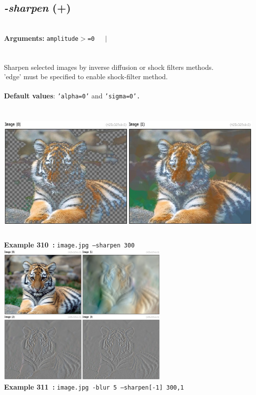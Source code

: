 \documentclass[a4paper,11pt,twoside]{book}
\begin{document}
\subsection{\emph{-sharpen} (+)}\vspace*{-0.5em}
~\\\textbf{Arguments: } 
{\small \texttt{amplitude$>$=0}}~~~$|$\\
\\~\\
Sharpen selected images by inverse diffusion or shock filters methods.
~\\'edge' must be specified to enable shock-filter method.
~\\~\\\textbf{Default values}: {\small \texttt{'alpha=0'} and \texttt{'sigma=0'.}}
\begin{center}\includegraphics[keepaspectratio=true,height=7cm,width=\textwidth]{img/gmic_def310.jpg}\\
{\footnotesize \textbf{Example 310~:} \texttt{image.jpg --sharpen 300}}
\\\includegraphics[keepaspectratio=true,height=7cm,width=\textwidth]{img/gmic_def311.jpg}\\
{\footnotesize \textbf{Example 311~:} \texttt{image.jpg -blur 5 --sharpen[-1] 300,1}}
\end{center}
\end{document}
